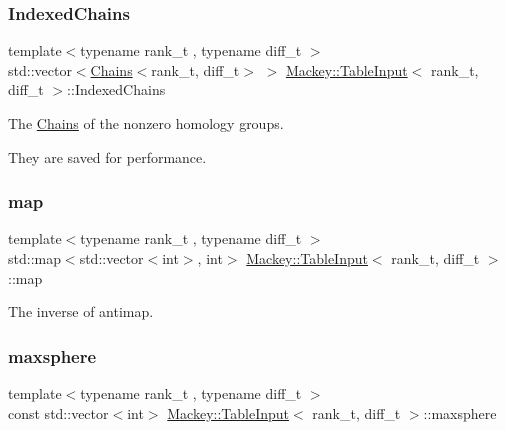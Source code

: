\subsubsection{\texorpdfstring{Indexed\+Chains}{IndexedChains}}
{\footnotesize\ttfamily template$<$typename rank\+\_\+t , typename diff\+\_\+t $>$ \\
std\+::vector$<$\hyperlink{classMackey_1_1Chains}{Chains}$<$rank\+\_\+t, diff\+\_\+t$>$ $>$ \hyperlink{classMackey_1_1TableInput}{Mackey\+::\+Table\+Input}$<$ rank\+\_\+t, diff\+\_\+t $>$\+::Indexed\+Chains\hspace{0.3cm}{\ttfamily [protected]}}



The \hyperlink{classMackey_1_1Chains}{Chains} of the nonzero homology groups. 

They are saved for performance. \mbox{\label{classMackey_1_1TableInput_abf72738d5aee3a185548d8a4db232ea4}} 
\subsubsection{\texorpdfstring{map}{map}}
{\footnotesize\ttfamily template$<$typename rank\+\_\+t , typename diff\+\_\+t $>$ \\
std\+::map$<$std\+::vector$<$int$>$, int$>$ \hyperlink{classMackey_1_1TableInput}{Mackey\+::\+Table\+Input}$<$ rank\+\_\+t, diff\+\_\+t $>$\+::map\hspace{0.3cm}{\ttfamily [protected]}}



The inverse of antimap. 

\mbox{\label{classMackey_1_1TableInput_a56448ebdfecb95da4c52349d4ccbf576}} 
\subsubsection{\texorpdfstring{maxsphere}{maxsphere}}
{\footnotesize\ttfamily template$<$typename rank\+\_\+t , typename diff\+\_\+t $>$ \\
const std\+::vector$<$int$>$ \hyperlink{classMackey_1_1TableInput}{Mackey\+::\+Table\+Input}$<$ rank\+\_\+t, diff\+\_\+t $>$\+::maxsphere\hspace{0.3cm}{\ttfamily [protected]}}




